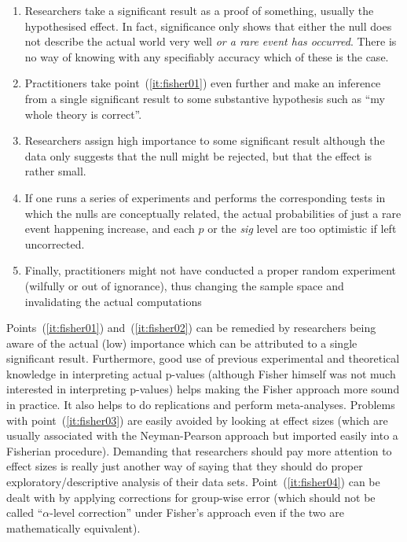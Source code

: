 \vspace{\baselineskip}
\begin{enumerate}
\item \label{it:fisher01} Researchers take a significant result as a proof of something, usually the hypothesised effect.
In fact, significance only shows that either the null does not describe the actual world very well \textit{or a rare event has occurred}.
There is no way of knowing with any specifiably accuracy which of these is the case.
\item \label{it:fisher02} Practitioners take point~(\ref{it:fisher01}) even further and make an inference from a single significant result to some substantive hypothesis such as ``my whole theory is correct''.
\item \label{it:fisher03} Researchers assign high importance to some significant result although the data only suggests that the null might be rejected, but that the effect is rather small.
\item \label{it:fisher04} If one runs a series of experiments and performs the corresponding tests in which the nulls are conceptually related, the actual probabilities of just a rare event happening increase, and each $p$ or the \textit{sig} level are too optimistic if left uncorrected.
\item \label{it:fisher05} Finally, practitioners might not have conducted a proper random experiment (wilfully or out of ignorance), thus changing the sample space and invalidating the actual computations
\end{enumerate}
\vspace{\baselineskip}

Points~(\ref{it:fisher01}) and~(\ref{it:fisher02}) can be remedied by researchers being aware of the actual (low) importance which can be attributed to a single significant result.
Furthermore, good use of previous experimental and theoretical knowledge in interpreting actual p-values (although Fisher himself was not much interested in interpreting p-values) helps making the Fisher approach more sound in practice.
It also helps to do replications and perform meta-analyses.
Problems with point~(\ref{it:fisher03}) are easily avoided by looking at effect sizes (which are usually associated with the Neyman-Pearson approach but imported easily into a Fisherian procedure).
Demanding that researchers should pay more attention to effect sizes is really just another way of saying that they should do proper exploratory\slash descriptive analysis of their data sets.
Point~(\ref{it:fisher04}) can be dealt with by applying corrections for group-wise error (which should not be called ``$\alpha$-level correction'' under Fisher's approach even if the two are mathematically equivalent).

